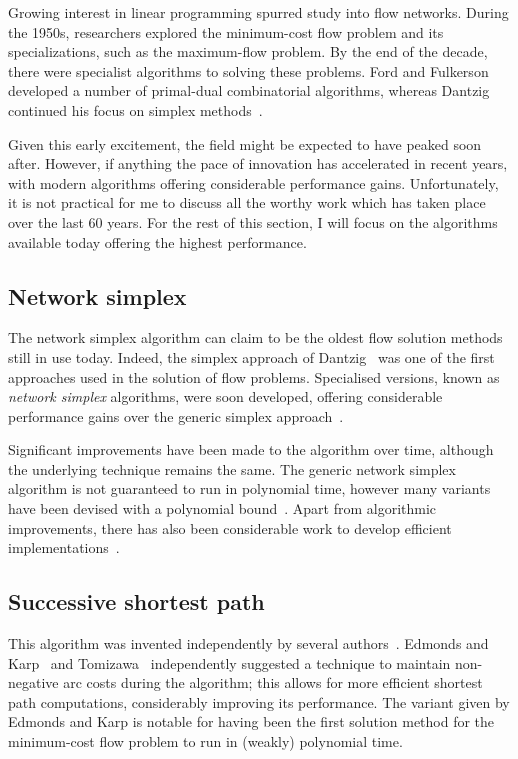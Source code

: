 Growing interest in linear programming spurred study into flow networks. During the 1950s, researchers explored the minimum-cost flow problem and its specializations, such as the maximum-flow problem. By the end of the decade, there were specialist algorithms to solving these problems. Ford and Fulkerson developed a number of primal-dual combinatorial algorithms, whereas Dantzig continued his focus on simplex methods~\cite{FordFulkerson:1962,Dantzig:1962}.

Given this early excitement, the field might be expected to have peaked soon after. However, if anything the pace of innovation has accelerated in recent years, with modern algorithms offering considerable performance gains. Unfortunately, it is not practical for me to discuss all the worthy work which has taken place over the last 60 years. For the rest of this section, I will focus on the algorithms available today offering the highest performance.

\subsection{Network simplex}

The network simplex algorithm can claim to be the oldest flow solution methods still in use today. Indeed, the simplex approach of Dantzig~\cite{Dantzig:1949} was one of the first approaches used in the solution of flow problems. Specialised versions, known as \emph{network simplex} algorithms, were soon developed, offering considerable performance gains over the generic simplex approach~\cite{Dantzig:1962}.

Significant improvements have been made to the algorithm over time, although the underlying technique remains the same. The generic network simplex algorithm is not guaranteed to run in polynomial time\footnotemark, however many variants have been devised with a polynomial bound~\cite{Tarjan:1991,Goldfarb:1992}. Apart from algorithmic improvements, there has also been considerable work to develop efficient implementations~\cite{Lobel:1996,Grigoriadis:1986}.

\subsection{Successive shortest path} \label{sec:intro-related-work-ssp}

This algorithm was invented independently by several authors~\cite{Jewell:1958,Iri:1960,BusackerGowen:1960}. Edmonds and Karp~\cite{Edmonds:1972} and Tomizawa~\cite{Tomizawa:1971} independently suggested a technique to maintain non-negative arc costs during the algorithm; this allows for more efficient shortest path computations, considerably improving its performance. The variant given by Edmonds and Karp is notable for having been the first solution method for the minimum-cost flow problem to run in (weakly) polynomial time\footnotemark.

